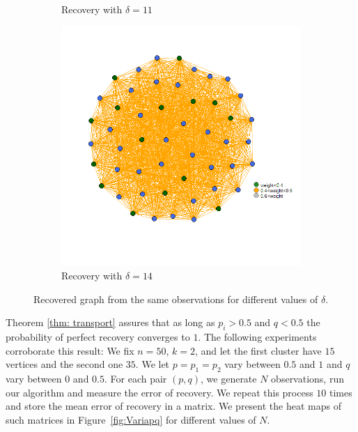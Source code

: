\documentclass[12pt]{amsart}
\theoremstyle{remark}
\begin{document}
\begin{figure}[h]
\begin{subfigure}[b]{0.37\textwidth}
         \caption{Recovery with $\delta=11$}
     \end{subfigure}
      \hfill
     \begin{subfigure}[b]{0.37\textwidth}
         \centering
         \includegraphics[width=\textwidth]{./Pictures/recupera8.png}
         \caption{Recovery with $\delta=14$}
     \end{subfigure}
        \caption{Recovered graph from the same observations for different values of $\delta$. }
        \label{fig:recupera}
\end{figure}



Theorem \ref{thm: transport} assures that as long as $p_i > 0.5$ and $q< 0.5$ the probability of perfect recovery converges to $1$. The following experiments corroborate this result:
We fix $n=50$, $k=2$, and let the first cluster have $15$ vertices and the second one $35$. We let $p =  p_1 = p_2$ vary between $0.5$ and $1$ and $q$ vary between $0$ and $0.5$.  For each pair $(p,q)$, we generate $N$ observations, run our algorithm and measure the error of recovery. We repeat this process $10$ times and store the mean error of recovery in a matrix.
We present the heat maps of such matrices in Figure~\ref{fig:Variapq} for different values of $N$. 
\end{document}
